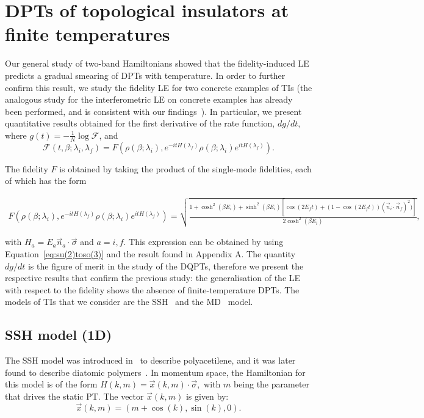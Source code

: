 \section{DPTs of topological insulators at finite temperatures}
\label{sec:num.results}
Our general study of two-band Hamiltonians showed that the fidelity-induced LE predicts a gradual smearing of DPTs with temperature. In order to further confirm this result, we study the fidelity LE for two concrete examples of TIs (the analogous study for the interferometric LE on concrete examples has already been performed, and is consistent with our findings~\cite{hey:bud:17,bah:ban:dut:17}). In particular, we present quantitative results obtained for the first derivative of the rate function, $dg/dt$, where $g(t)=-\frac{1}{N}\log \mathcal{F}$, and 
\begin{equation*}
\mathcal{F}(t,\beta;\lambda_i,\lambda_f)=F(\rho(\beta;\lambda_i),e^{-it H(\lambda_f)}\rho(\beta;\lambda_i)e^{itH(\lambda_f)}).
\end{equation*}

The fidelity $F$ is obtained by taking the product of the single-mode fidelities, each of  which has the form
\begin{footnotesize}
\begin{eqnarray*}
F(\rho(\beta;\lambda_i),e^{-it H(\lambda_f)}\rho(\beta;\lambda_i)e^{itH(\lambda_f)}) =\sqrt{\frac{1+\cosh^2(\beta E_i)+\sinh^2(\beta E_i)\left[\cos(2E_f t)+(1-\cos(2E_f t))(\vec{n}_i\cdot\vec{n}_f)^2)\right]}{2\cosh^2(\beta E_i)}},	
\end{eqnarray*}\end{footnotesize}with $H_a=E_a\vec{n}_a\cdot \vec{\sigma}$ and $a=i,f$. This expression can be obtained by using Equation~\eqref{eq:su(2)toso(3)} and the result found in Appendix A. The quantity $dg/dt$ is the figure of merit in the study of the DQPTs, therefore we present the respective results that confirm the previous study: the generalisation of the LE with respect to the fidelity shows the absence of finite-temperature DPTs.  The models of TIs that we consider are the SSH~\cite{su:sch:hee:79} and the MD~\cite{qi:hug:zha:08} model. 


\subsection{SSH model (1D)}
The SSH model was introduced in~\cite{su:sch:hee:79} to describe polyacetilene, and it was later found to describe diatomic polymers~\cite{ric:mel:82}. In momentum space, the Hamiltonian for this model is of the form $H(k,m)=\vec{x}(k,m)\cdot\vec{\sigma},$ with $m$ being the parameter that drives the static PT. The vector $\vec{x}(k,m)$ is given by:
\begin{equation*}
\vec{x}(k,m)=(m+\cos(k),\sin(k),0).
\end{equation*}

